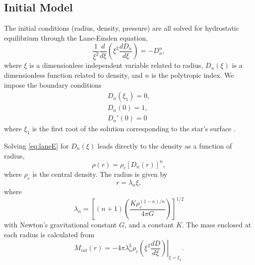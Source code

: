 \documentclass[12pt]{article}
\begin{document}
\subsection{Initial Model}
The initial conditions (radius, density, pressure) are all solved for hydrostatic equilibrium through the Lane-Emden equation,
\begin{equation}\label{eq:laneE}
    \frac{1}{\xi^{2}}\frac{d}{d\xi}\left( \xi^{2}\frac{dD_{n}}{d\xi} \right)=-D_{n}^{n},
\end{equation}
where $\xi$ is a dimensionless independent variable related to radius,  $D_{n}(\xi)$ is a
dimensionless function related to density, and $n$ is the polytropic index. We impose the
boundary conditions
\begin{equation}
\begin{split}
    D_{n}(\xi_{1})=0, \\
    D_{n}(0) = 1, \\
    D_{n}'(0) = 0
\end{split}
\end{equation}
where $\xi_{1}$ is the first root of the solution corresponding to the star's surface \citep{bob}.

Solving \autoref{eq:laneE} for $D_{n}(\xi)$ leads directly to the density as a function of radius,
\begin{equation}
    \rho(r)=\rho_{c}[D_{n}(r)]^{n},
\end{equation}
where $\rho_{c}$ is the central density.
The radius is given by
\begin{equation}
    r = \lambda_{n} \xi,
\end{equation}
where
\begin{equation}
    \lambda_{n}=\left[(n+1)\left( \frac{K \rho_{c}^{(1-n)/n}}{4\pi G} \right) \right]^{1/2}
\end{equation}
with Newton's gravitational constant $G$, and a constant $K$.
The mass enclosed at each radius is calculated from
\begin{equation}
    M_{int}(r) = -4 \pi \lambda_{n}^{3} \rho_{c} \left.\left(\xi^2 \frac{dD}{d\xi}\right)\right|_{\xi=\xi_1}.
\end{equation}
\end{document}
